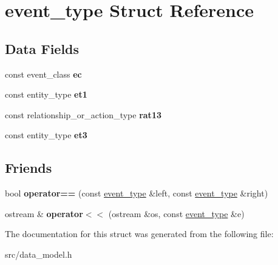 \hypertarget{structevent__type}{}\section{event\+\_\+type Struct Reference}
\label{structevent__type}
\subsection*{Data Fields}
\begin{DoxyCompactItemize}
\item 
\mbox{\label{structevent__type_a56c49b8b98c18fb39797a92285387eca}} 
const event\+\_\+class {\bfseries ec}
\item 
\mbox{\label{structevent__type_a127abbfe7df2d4e442ef38c4d12b6dd2}} 
const entity\+\_\+type {\bfseries et1}
\item 
\mbox{\label{structevent__type_a7fe60f7b335a887a54c37c4b9fcfb400}} 
const relationship\+\_\+or\+\_\+action\+\_\+type {\bfseries rat13}
\item 
\mbox{\label{structevent__type_a685ac2668f6698357089949c495f6fe3}} 
const entity\+\_\+type {\bfseries et3}
\end{DoxyCompactItemize}
\subsection*{Friends}
\begin{DoxyCompactItemize}
\item 
\mbox{\label{structevent__type_ac6ea5340a97cf343356e390f082881de}} 
bool {\bfseries operator==} (const \hyperlink{structevent__type}{event\+\_\+type} \&left, const \hyperlink{structevent__type}{event\+\_\+type} \&right)
\item 
\mbox{\label{structevent__type_aaeec0fa308de88d46a6abc86499fe596}} 
ostream \& {\bfseries operator$<$$<$} (ostream \&os, const \hyperlink{structevent__type}{event\+\_\+type} \&e)
\end{DoxyCompactItemize}


The documentation for this struct was generated from the following file\+:\begin{DoxyCompactItemize}
\item 
src/data\+\_\+model.\+h\end{DoxyCompactItemize}
